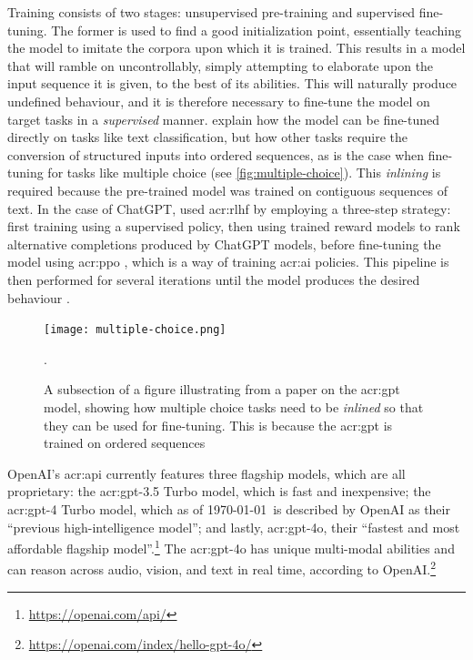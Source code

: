 Training consists of two stages: unsupervised pre-training and supervised fine-tuning. The former is used to find a good initialization point, essentially teaching the model to imitate the corpora upon which it is trained. This results in a model that will ramble on uncontrollably, simply attempting to elaborate upon the input sequence it is given, to the best of its abilities. This will naturally produce undefined behaviour, and it is therefore necessary to fine-tune the model on target tasks in a \textit{supervised} manner. \cite[4]{radfordImprovingLanguageUnderstanding2018} explain how the model can be fine-tuned directly on tasks like text classification, but how other tasks require the conversion of structured inputs into ordered sequences, as is the case when fine-tuning for tasks like multiple choice (see \autoref{fig:multiple-choice}). This \textit{inlining} is required because the pre-trained model was trained on contiguous sequences of text. In the case of ChatGPT, \citeauthor{openaiIntroducingChatGPT2022} used \gls{acr:rlhf} \citep{christianoDeepReinforcementLearning2023} by employing a three-step strategy: first training using a supervised policy, then using trained reward models to rank alternative completions produced by ChatGPT models, before fine-tuning the model using \gls{acr:ppo} \citep{schulmanProximalPolicyOptimization2017}, which is a way of training \acrshort{acr:ai} policies. This pipeline is then performed for several iterations until the model produces the desired behaviour \citep{openaiIntroducingChatGPT2022}.

\begin{figure}
    \centering
    \texttt{[image: multiple-choice.png]}
    \caption[Inlining of a multiple choice task for GPT fine-tuning]{A subsection of a figure illustrating from a paper on the \acrshort{acr:gpt} model, showing how multiple choice tasks need to be \textit{inlined} so that they can be used for fine-tuning. This is because the \acrshort{acr:gpt} is trained on ordered sequences \citep[4]{radfordImprovingLanguageUnderstanding2018}}.
    \label{fig:multiple-choice}
\end{figure}

OpenAI's \acrshort{acr:api} currently features three flagship models, which are all proprietary: the \acrshort{acr:gpt}-3.5 Turbo model, which is fast and inexpensive; the \acrshort{acr:gpt}-4 Turbo model, which as of \today~is described by OpenAI as their \enquote{previous high-intelligence model}; and lastly, \acrshort{acr:gpt}-4o, their \enquote{fastest and most affordable flagship model}.\footnote{\url{https://openai.com/api/}} The \acrshort{acr:gpt}-4o has unique multi-modal abilities and can reason across audio, vision, and text in real time, according to OpenAI.\footnote{\url{https://openai.com/index/hello-gpt-4o/}}

